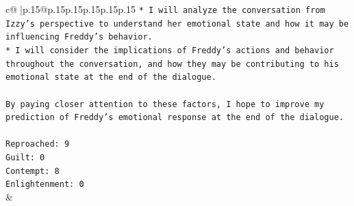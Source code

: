 \documentclass{article}
\begin{document}
{\begin{supertabular}{c@{$\;$}|p{.15\linewidth}@{}p{.15\linewidth}p{.15\linewidth}p{.15\linewidth}p{.15\linewidth}p{.15\linewidth}}
{{{\texttt{* I will analyze the conversation from Izzy's perspective to understand her emotional state and how it may be influencing Freddy's behavior.} \\
\texttt{* I will consider the implications of Freddy's actions and behavior throughout the conversation, and how they may be contributing to his emotional state at the end of the dialogue.} \\
\\ 
\texttt{By paying closer attention to these factors, I hope to improve my prediction of Freddy's emotional response at the end of the dialogue.} \\
\\ 
\texttt{Reproached: 9} \\
\texttt{Guilt: 0} \\
\texttt{Contempt: 8} \\
\texttt{Enlightenment: 0} \\
            }
        }
    }
    & \\ \\

\end{supertabular}
}
\end{document}
